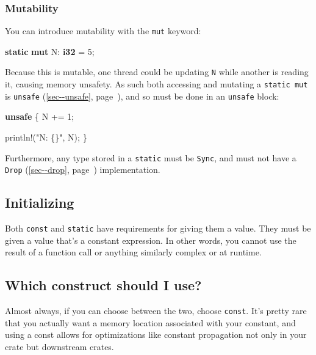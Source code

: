 \documentclass[a4paper,]{book}
\renewcommand*{\hyperref}[2][\ar]{%
  \def\ar{#2}%
  #2 (\autoref{#1}, page~\pageref{#1})}
\newenvironment{Shaded}{\begin{snugshade}}{\end{snugshade}}
\newcommand{\KeywordTok}[1]{\textcolor[rgb]{0.13,0.29,0.53}{\textbf{{#1}}}}
\newcommand{\DecValTok}[1]{\textcolor[rgb]{0.00,0.00,0.81}{{#1}}}
\newcommand{\StringTok}[1]{\textcolor[rgb]{0.31,0.60,0.02}{{#1}}}
\newcommand{\OtherTok}[1]{\textcolor[rgb]{0.56,0.35,0.01}{{#1}}}
\newcommand{\NormalTok}[1]{{#1}}
\begin{document}
\subsubsection{Mutability}\label{mutability-1}

You can introduce mutability with the \texttt{mut} keyword:

\begin{Shaded}
\begin{Highlighting}[]
\KeywordTok{static} \KeywordTok{mut} \NormalTok{N: }\KeywordTok{i32} \NormalTok{= }\DecValTok{5}\NormalTok{;}
\end{Highlighting}
\end{Shaded}

Because this is mutable, one thread could be updating \texttt{N} while
another is reading it, causing memory unsafety. As such both accessing
and mutating a \texttt{static\ mut} is
\hyperref[sec--unsafe]{\texttt{unsafe}}, and so must be done in an
\texttt{unsafe} block:

\begin{Shaded}
\begin{Highlighting}[]

\KeywordTok{unsafe} \NormalTok{\{}
    \NormalTok{N += }\DecValTok{1}\NormalTok{;}

    \OtherTok{println!}\NormalTok{(}\StringTok{"N: \{\}"}\NormalTok{, N);}
\NormalTok{\}}
\end{Highlighting}
\end{Shaded}

Furthermore, any type stored in a \texttt{static} must be \texttt{Sync},
and must not have a \hyperref[sec--drop]{\texttt{Drop}} implementation.

\subsection{Initializing}\label{initializing}

Both \texttt{const} and \texttt{static} have requirements for giving
them a value. They must be given a value that's a constant expression.
In other words, you cannot use the result of a function call or anything
similarly complex or at runtime.

\subsection{Which construct should I
use?}\label{which-construct-should-i-use}

Almost always, if you can choose between the two, choose \texttt{const}.
It's pretty rare that you actually want a memory location associated
with your constant, and using a const allows for optimizations like
constant propagation not only in your crate but downstream crates.
\end{document}
